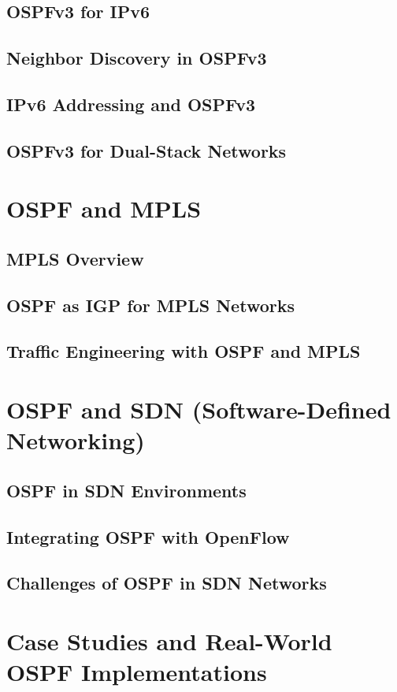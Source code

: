 \documentclass{book}
\begin{document}
    \section{OSPFv3 for IPv6}
    \section{Neighbor Discovery in OSPFv3}
    \section{IPv6 Addressing and OSPFv3}
    \section{OSPFv3 for Dual-Stack Networks}
    
\chapter{OSPF and MPLS}
    \section{MPLS Overview}
    \section{OSPF as IGP for MPLS Networks}
    \section{Traffic Engineering with OSPF and MPLS}
    
\chapter{OSPF and SDN (Software-Defined Networking)}
    \section{OSPF in SDN Environments}
    \section{Integrating OSPF with OpenFlow}
    \section{Challenges of OSPF in SDN Networks}

\chapter{Case Studies and Real-World OSPF Implementations}
\end{document}
